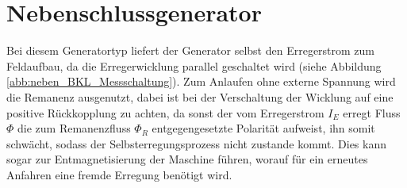 \section{Nebenschlussgenerator}
Bei diesem Generatortyp liefert der Generator selbst den Erregerstrom zum Feldaufbau, da die Erregerwicklung parallel geschaltet wird (siehe Abbildung \ref{abb:neben_BKL_Messschaltung}). Zum Anlaufen ohne externe Spannung wird die Remanenz ausgenutzt, dabei ist bei der Verschaltung der Wicklung auf eine positive Rückkopplung zu achten, da sonst der vom Erregerstrom $I_E$ erregt Fluss $\Phi$ die zum Remanenzfluss $\Phi_R$ entgegengesetzte Polarität aufweist, ihn somit schwächt, sodass der Selbsterregungsprozess nicht zustande kommt. Dies kann sogar zur Entmagnetisierung der Maschine führen, worauf für ein erneutes Anfahren eine fremde Erregung benötigt wird.\\

